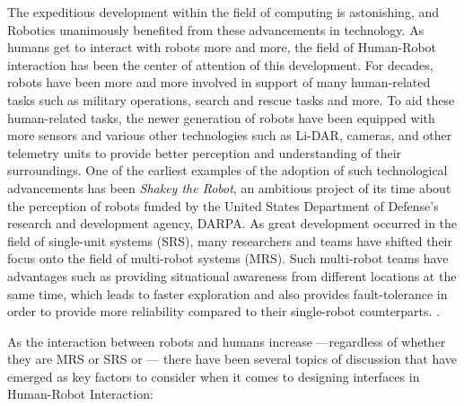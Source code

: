 \documentclass[conference]{IEEEtran}
\begin{document}
The expeditious development within the field of computing is astonishing, and Robotics unanimously benefited from these advancements in technology. As humans get to interact with robots more and more, the field of Human-Robot interaction has been the center of attention of this development. For decades, robots have been more and more involved in support of many human-related tasks such as military operations, search and rescue tasks and more. To aid these human-related tasks, the newer generation of robots have been equipped with more sensors and various other technologies such as Li-DAR, cameras, and other telemetry units to provide better perception and understanding of their surroundings. One of the earliest examples of the adoption of such technological advancements has been \textit{Shakey the Robot}, an ambitious project of its time about the perception of robots funded by the United States Department of Defense’s research and development agency, DARPA\cite{b1}. As great development occurred in the field of single-unit systems (SRS), many researchers and teams have shifted their focus onto the field of multi-robot systems (MRS). \cite{b2} Such multi-robot teams have advantages such as providing situational awareness from different locations at the same time, which leads to faster exploration and also provides fault-tolerance in order to provide more reliability compared to their single-robot counterparts. \cite{b3} \cite{b2}. 


As the interaction between robots and humans increase —regardless of whether they are MRS or SRS or  — there have been several topics of discussion that have emerged as key factors to consider when it comes to designing interfaces in Human-Robot Interaction:\cite{b4}
\end{document}
